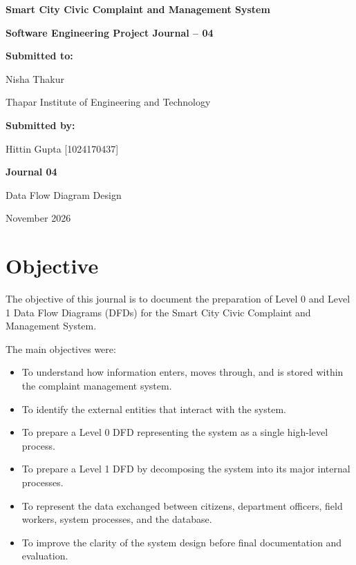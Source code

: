 \documentclass[12pt,a4paper]{article}
\begin{document}
\begin{titlepage}
\centering
\vspace*{0.8in}

{\Large\bfseries Smart City Civic Complaint and Management System\par}

\vspace{0.25in}

{\large\bfseries Software Engineering Project Journal -- 04\par}

\vspace{0.8in}

\textbf{Submitted to:}\par
Nisha Thakur\par
Thapar Institute of Engineering and Technology\par

\vspace{0.45in}

\textbf{Submitted by:}\par
Hittin Gupta [1024170437]\par

\vfill

\textbf{Journal 04}\par
Data Flow Diagram Design\par
November 2026

\end{titlepage}

\section{Objective}

The objective of this journal is to document the preparation of Level 0 and
Level 1 Data Flow Diagrams (DFDs) for the Smart City Civic Complaint and
Management System.

The main objectives were:

\begin{itemize}[leftmargin=*]
    \item To understand how information enters, moves through, and is stored
    within the complaint management system.
    \item To identify the external entities that interact with the system.
    \item To prepare a Level 0 DFD representing the system as a single
    high-level process.
    \item To prepare a Level 1 DFD by decomposing the system into its major
    internal processes.
    \item To represent the data exchanged between citizens, department
    officers, field workers, system processes, and the database.
    \item To improve the clarity of the system design before final
    documentation and evaluation.
\end{itemize}
\end{document}
